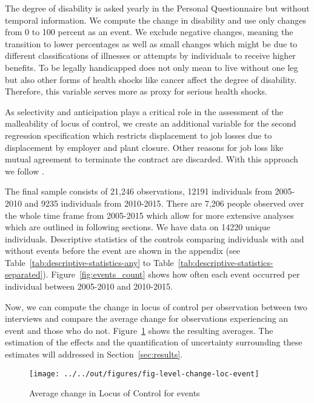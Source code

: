 \documentclass[12pt, a4paper, fleqn, parskip]{scrartcl}
\begin{document}
The degree of disability is asked yearly in the Personal Questionnaire but without
temporal information. We compute the change in disability and use only changes from 0 to
100 percent as an event. We exclude negative changes, meaning the transition to lower
percentages as well as small changes which might be due to different classifications of
illnesses or attempts by individuals to receive higher benefits. To be legally
handicapped does not only mean to live without one leg but also other forms of health
shocks like cancer affect the degree of disability. Therefore, this variable serves more
as proxy for serious health shocks.

As selectivity and anticipation plays a critical role in the assessment of the
malleability of locus of control, we create an additional variable for the second
regression specification which restricts displacement to job losses due to displacement
by employer and plant closure. Other reasons for job loss like mutual agreement to
terminate the contract are discarded. With this approach we follow \citet{preuss2017}.

The final sample consists of 21,246 observations, 12191 individuals from 2005-2010 and
9235 individuals from 2010-2015. There are 7,206 people observed over the whole time
frame from 2005-2015 which allow for more extensive analyses which are outlined in
following sections. We have data on 14220 unique individuals. Descriptive statistics of
the controls comparing individuals with and without events before the event are shown in
the appendix (see Table~\ref{tab:descriptive-statistics-any} to
Table~\ref{tab:descriptive-statistics-separated}). Figure~\ref{fig:events_count} shows
how often each event occurred per individual between 2005-2010 and 2010-2015.

Now, we can compute the change in locus of control per observation between two
interviews and compare the average change for observations experiencing an event and
those who do not. Figure~\ref{fig:level-change-loc-event} shows the resulting averages.
The estimation of the effects and the quantification of uncertainty surrounding these
estimates will addressed in Section~\ref{sec:results}.

\begin{figure}[H]
    \centering
    \texttt{[image: ../../out/figures/fig-level-change-loc-event]}
    \caption{Average change in Locus of Control for events}
    \label{fig:level-change-loc-event}
\end{figure}
\end{document}
